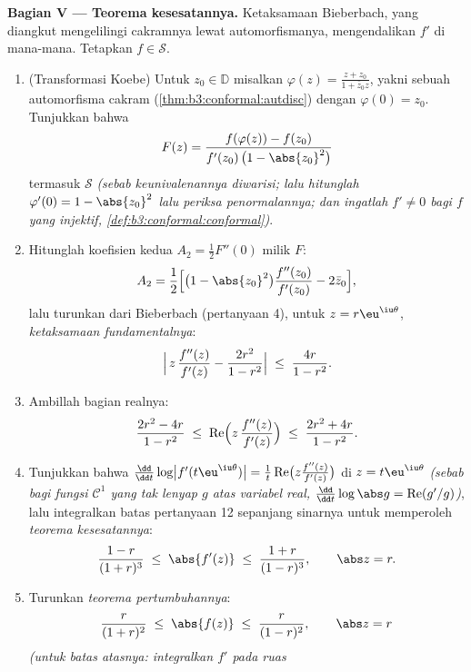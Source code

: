 \begin{problem}
\medskip
\noindent\textbf{Bagian V --- Teorema kesesatannya.}
Ketaksamaan Bieberbach, yang diangkut mengelilingi cakramnya lewat
automorfismanya, mengendalikan $f'$ di mana-mana. Tetapkan $f \in \mathcal
S$.
\begin{enumerate}[resume]
  \item (Transformasi Koebe) Untuk $z_0 \in \mathbb D$ misalkan
        $\varphi(z) = \frac{z + z_0}{1 + \bar z_0z}$, yakni sebuah
        automorfisma cakram (\cref{thm:b3:conformal:autdisc}) dengan
        $\varphi(0) = z_0$. Tunjukkan bahwa
        \[
        F(z) = \frac{f(\varphi(z)) - f(z_0)}
        {f'(z_0)\,\bigl(1 - \abs{z_0}^2\bigr)}
        \]
        termasuk $\mathcal S$ \emph{(sebab keunivalenannya
        diwarisi; lalu hitunglah $\varphi'(0) = 1 - \abs{z_0}^2$
        lalu periksa penormalannya; dan ingatlah $f' \neq 0$ bagi
        $f$ yang injektif,
        \cref{def:b3:conformal:conformal})}.
  \item Hitunglah koefisien kedua $A_2 = \frac12F''(0)$
        milik $F$:
        \[
        A_2 = \frac12\Bigl[\bigl(1 - \abs{z_0}^2\bigr)
        \frac{f''(z_0)}{f'(z_0)} - 2\bar z_0\Bigr] ,
        \]
        lalu turunkan dari Bieberbach (pertanyaan 4), untuk $z =
        r\eu^{\iu\theta}$, \emph{ketaksamaan
        fundamentalnya}:
        \[
        \Bigl|\,z\,\frac{f''(z)}{f'(z)} -
        \frac{2r^2}{1 - r^2}\Bigr|
        \;\leq\; \frac{4r}{1 - r^2} .
        \]
  \item Ambillah bagian realnya:
        \[
        \frac{2r^2 - 4r}{1 - r^2} \;\leq\;
        \operatorname{Re}\Bigl(z\,\frac{f''(z)}{f'(z)}\Bigr)
        \;\leq\; \frac{2r^2 + 4r}{1 - r^2} .
        \]
  \item Tunjukkan bahwa $\frac{\dd}{\dd t}\log\bigl|
        f'(t\eu^{\iu\theta})\bigr| = \frac1t
        \operatorname{Re}\bigl(z\frac{f''(z)}{f'(z)}\bigr)$
        di $z = t\eu^{\iu\theta}$ \emph{(sebab bagi fungsi
        $\mathcal C^1$ yang tak lenyap $g$ atas variabel real,
        $\frac{\dd}{\dd t}\log\abs g =
        \operatorname{Re}(g'/g)$)}, lalu integralkan batas
        pertanyaan 12 sepanjang sinarnya untuk memperoleh
        \emph{teorema kesesatannya}:
        \[
        \frac{1 - r}{(1 + r)^3} \;\leq\; \abs{f'(z)}
        \;\leq\; \frac{1 + r}{(1 - r)^3},
        \qquad \abs z = r .
        \]
  \item Turunkan \emph{teorema pertumbuhannya}:
        \[
        \frac{r}{(1 + r)^2} \;\leq\; \abs{f(z)} \;\leq\;
        \frac{r}{(1 - r)^2},
        \qquad \abs z = r
        \]
        \emph{(untuk batas atasnya: integralkan $f'$ pada ruas
}
\end{enumerate}
\end{problem}
